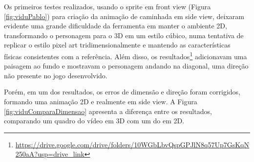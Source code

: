 

Os primeiros testes realizados, usando o sprite em front view (Figura \ref{fig:viduPablo}) para criação da animação de caminhada em side view, deixaram evidente uma grande dificuldade da ferramenta em manter o ambiente 2D, transformando o personagem para o 3D em um estilo cúbico, numa tentativa de replicar o estilo pixel art tridimensionalmente e mantendo as características físicas consistentes com a referência. Além disso, os resultados\footnote{\url{https://drive.google.com/drive/folders/10WGbLbvQspGPJlN8q57Up7GsKqN250aA?usp=drive_link}} adicionavam uma paisagem ao fundo e mostravam o personagem andando na diagonal, uma direção não presente no jogo desenvolvido. 


Porém, em um dos resultados, os erros de dimensão e direção foram corrigidos, formando uma animação 2D e realmente em side view. A Figura \ref{fig:viduComparaDimensao} apresenta a diferença entre os resultados, comparando um quadro do vídeo em 3D com um do em 2D.

